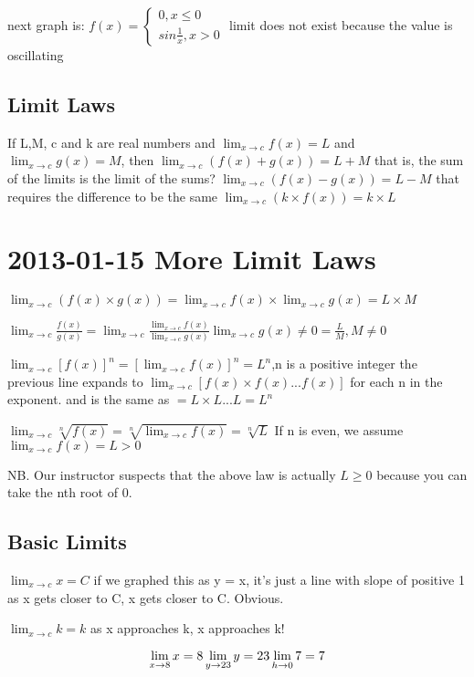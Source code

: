 \documentclass[12pt]{article}
\begin{document}
next graph is: $f(x) = \left\{\begin{array}{l}
0,x \leq 0\\
sin \frac{1}{x}, x > 0
\end{array} \right. $
limit does not exist because the value is oscillating

\subsection{Limit Laws}
If L,M, c and k are real numbers and
$\lim_{x \to c} f(x) = L$ and $\lim_{x \to c} g(x) = M$, then
$\lim_{x \to c}(f(x) + g(x)) = L+M$
that is, the sum of the limits is the limit of the sums?
$\lim_{x \to c}(f(x) - g(x)) = L-M$
that requires the difference to be the same
$\lim_{x \to c}( k \times f(x)) = k \times L$

\section{2013-01-15 More Limit Laws}

$\lim_{x \to c}(f(x) \times g(x)) = \lim_{x \to c}f(x) \times \lim_{x \to c}g(x) = L \times M$

$\lim_{x \to c} \frac{f(x)}{g(x)} = \lim_{x \to c} \frac{\lim_{x \to c} f(x)}{\lim_{x \to c} g(x)} \lim_{x \to
  c}g(x) \neq 0 = \frac{L}{M},M \neq 0$

$\lim_{x \to c}[f(x)]^n = [\lim_{x \to c}f(x)]^n = L^n$,n is a positive integer
the previous line expands to $\lim_{x \to c}[f(x) \times f(x) ... f(x)]$ for each n in the exponent.
and is the same as $=L \times L ... L = L^n$

$\lim_{x \to c}\sqrt[n]{f(x)} = \sqrt[n]{\lim_{x\to c}f(x)} = \sqrt[n]{L}$
If n is even, we assume $\lim_{x \to c}f(x) = L > 0$

NB. Our instructor suspects that the above law is actually $L \geq 0$ because you can take the nth root of 0.

\subsection{Basic Limits}

$\lim_{x \to c}x = C$
if we graphed this as y = x, it's just a line with slope of positive 1
as x gets closer to C, x gets closer to C. Obvious.

$\lim_{x \to c}k = k$ as x approaches k, x approaches k!

$$
\lim_{x \to 8} x = 8\\
\lim_{y \to 23} y = 23\\
\lim_{h \to 0} 7 = 7
$$
\end{document}
